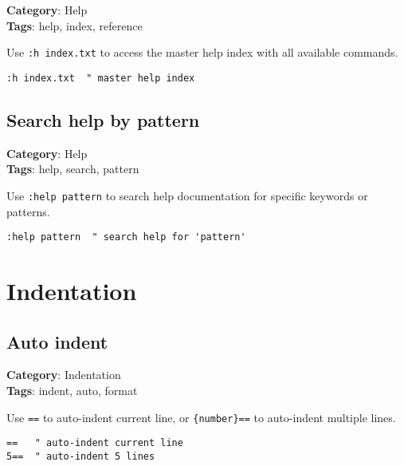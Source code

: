 {{{{{\textbf{Category}: Help\\ \textbf{Tags}: help, index, reference
\vspace{0.5cm}

Use {\footnotesize \Verb§:h index.txt§} to access the master help index with all available commands.

\begin{Exa*}{}
\begin{Verbatim}[fontsize=\footnotesize, breaklines, breakanywhere]
:h index.txt  " master help index
\end{Verbatim}
\end{Exa*}

\section{Search help by pattern}

\textbf{Category}: Help\\ \textbf{Tags}: help, search, pattern
\vspace{0.5cm}

Use {\footnotesize \Verb§:help pattern§} to search help documentation for specific keywords or patterns.

\begin{Exa*}{}
\begin{Verbatim}[fontsize=\footnotesize, breaklines, breakanywhere]
:help pattern  " search help for 'pattern'
\end{Verbatim}
\end{Exa*}

\chapter{Indentation}
\section{Auto indent}

\textbf{Category}: Indentation\\ \textbf{Tags}: indent, auto, format
\vspace{0.5cm}

Use {\footnotesize \Verb§==§} to auto-indent current line, or {\footnotesize \Verb§{number}==§} to auto-indent multiple lines.

\begin{Exa*}{}
\begin{Verbatim}[fontsize=\footnotesize, breaklines, breakanywhere]
==   " auto-indent current line
5==  " auto-indent 5 lines
\end{Verbatim}
\end{Exa*}

}}}}}
